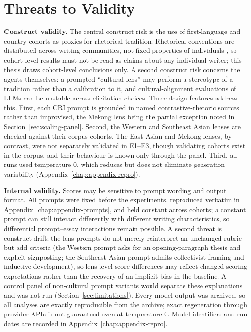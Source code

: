 \section{Threats to Validity}
\label{sec:threats}

\textbf{Construct validity.} The central construct risk is the use of
first-language and country cohorts as proxies for rhetorical
tradition. Rhetorical conventions are distributed across writing
communities, not fixed properties of individuals
\citep{connor2011intercultural}, so cohort-level results must not be
read as claims about any individual writer; this thesis draws
cohort-level conclusions only. A second construct risk concerns the
agents themselves: a prompted ``cultural lens'' may perform a
stereotype of a tradition rather than a calibration to it, and
cultural-alignment evaluations of LLMs can be unstable across
elicitation choices. Three design features address this. First, each CRI
prompt is grounded in named contrastive-rhetoric sources rather than
improvised, the Mekong lens being the partial exception noted in
Section~\ref{sec:scaling-panel}. Second, the Western and
Southeast Asian lenses are checked against their corpus cohorts.
The East Asian and Mekong lenses, by contrast, were not separately
validated in E1--E3, though validating cohorts exist in the corpus,
and their behaviour is known only through the panel. Third, all runs
used temperature 0, which reduces but does not eliminate generation
variability (Appendix~\ref{chap:appendix-repro}).

\textbf{Internal validity.} Scores may be sensitive to prompt wording
and output format. All prompts were fixed before the experiments,
reproduced verbatim in Appendix~\ref{chap:appendix-prompts}, and
held constant across cohorts; a constant prompt can still interact
differently with different writing characteristics, so differential
prompt--essay interactions remain possible. A second threat is
construct drift: the lens prompts do not merely reinterpret an
unchanged rubric but add criteria (the Western prompt asks for an
opening-paragraph thesis and explicit signposting; the Southeast
Asian prompt admits collectivist framing and inductive
development), so lens-level score differences may reflect changed
scoring expectations rather than the recovery of an implicit bias in
the baseline. A control panel of non-cultural prompt variants would
separate these explanations and was not run
(Section~\ref{sec:limitations}). Every model output was archived,
so all analyses are exactly reproducible from the archive; exact
regeneration through provider APIs is not guaranteed even at
temperature 0. Model identifiers and run dates are recorded in
Appendix~\ref{chap:appendix-repro}.

